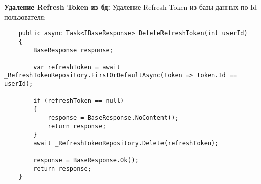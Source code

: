 \textbf{Удаление Refresh Token из бд:} Удаление Refresh Token из базы данных по Id пользователя:
\begin{verbatim}
    public async Task<IBaseResponse> DeleteRefreshToken(int userId)
    {
        BaseResponse response;

        var refreshToken = await _RefreshTokenRepository.FirstOrDefaultAsync(token => token.Id == userId);

        if (refreshToken == null)
        {
            response = BaseResponse.NoContent();
            return response;
        }
        await _RefreshTokenRepository.Delete(refreshToken);

        response = BaseResponse.Ok();
        return response;
    }
\end{verbatim}
